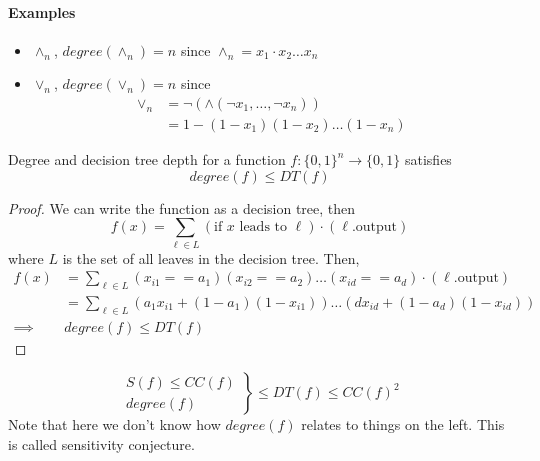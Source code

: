 \paragraph{Examples}
\begin{itemize}
	\item $\land_n$, $degree(\land_n) = n$ since $\land_n = x_1 \cdot x_2 \dots x_n$
	\item $\lor_n$, $degree(\lor_n) = n$ since 
		\begin{align}
			\lor_n 
			&= \neg( \land ( \neg x_1, \dots, \neg x_n )) \\
			&= 1 - (1 - x_1) (1 - x_2 ) \dots (1 - x_n)
		\end{align}
\end{itemize}

\begin{proposition}
	Degree and decision tree depth for a function $f: \{0 ,1 \}^ n \rightarrow \{ 0 , 1\}$ satisfies
	\begin{equation}
		degree(f) \leq DT(f)
	\end{equation}	
\end{proposition}
\begin{proof}
	We can write the function as a decision tree, then
	\begin{equation}
		f(x) = \sum_{\ell \in L} (\text{if $x$ leads to } \ell) \cdot (\ell\text{.output})
	\end{equation}
	where $L$ is the set of all leaves in the decision tree. Then, 
	\begin{align}
		f(x) 
		&= \sum_{\ell \in L} (x_{i1} == a_1) (x_{i2} == a_2) \dots (x_{id} == a_d) \cdot (\ell \text{.output} ) \\
		&= \sum_{\ell \in L} \left(a_1 x_{i1} + (1 - a_1) (1 - x_{i1})\right) \dots \left(d x_{id} + ( 1 - a_d) (1 - x_{id})\right)\\
	    \implies & degree(f) \leq DT(f)
	\end{align}
\end{proof}

\begin{proposition} 
	[Summary]
	\begin{equation}
		\left.
		\begin{aligned}
			 S(f) \leq CC(f) \\
			 degree(f)
		\end{aligned} \right\}
		\leq DT(f) \leq CC(f)^2
	\end{equation}
	Note that here we don't know how $degree(f)$ relates to things on the left. This is called sensitivity conjecture. 	
\end{proposition}

